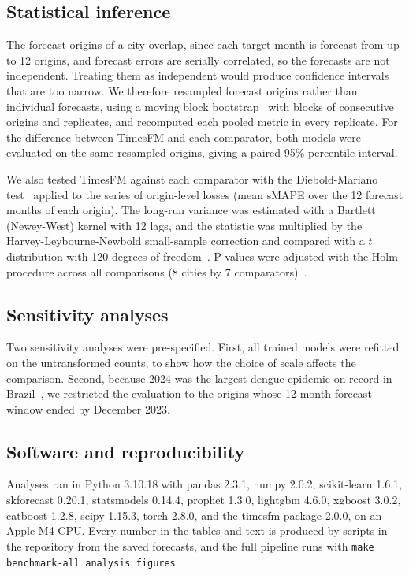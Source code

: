 \documentclass[10pt,letterpaper]{article}
\begin{document}
\subsection*{Statistical inference}
The  forecast origins of a city overlap, since each target month is forecast from up to 12 origins, and forecast errors are serially correlated, so the  forecasts are not independent. Treating them as independent would produce confidence intervals that are too narrow. We therefore resampled forecast origins rather than individual forecasts, using a moving block bootstrap~\cite{Kunsch1989} with blocks of  consecutive origins and  replicates, and recomputed each pooled metric in every replicate. For the difference between TimesFM and each comparator, both models were evaluated on the same resampled origins, giving a paired 95\% percentile interval.

We also tested TimesFM against each comparator with the Diebold-Mariano test~\cite{DieboldMariano1995} applied to the series of  origin-level losses (mean sMAPE over the 12 forecast months of each origin). The long-run variance was estimated with a Bartlett (Newey-West) kernel with 12 lags, and the statistic was multiplied by the Harvey-Leybourne-Newbold small-sample correction and compared with a $t$ distribution with 120 degrees of freedom~\cite{HarveyLeybourneNewbold1997}. P-values were adjusted with the Holm procedure across all  comparisons (8 cities by 7 comparators)~\cite{Holm1979}.

\subsection*{Sensitivity analyses}
Two sensitivity analyses were pre-specified. First, all trained models were refitted on the untransformed counts, to show how the choice of scale affects the comparison. Second, because 2024 was the largest dengue epidemic on record in Brazil~\cite{GurgelGoncalves2024}, we restricted the evaluation to the  origins whose 12-month forecast window ended by December 2023.

\subsection*{Software and reproducibility}
Analyses ran in Python 3.10.18 with pandas 2.3.1, numpy 2.0.2, scikit-learn 1.6.1, skforecast 0.20.1, statsmodels 0.14.4, prophet 1.3.0, lightgbm 4.6.0, xgboost 3.0.2, catboost 1.2.8, scipy 1.15.3, torch 2.8.0, and the timesfm package 2.0.0, on an Apple M4 CPU. Every number in the tables and text is produced by scripts in the repository from the saved forecasts, and the full pipeline runs with \texttt{make benchmark-all analysis figures}.
\end{document}
